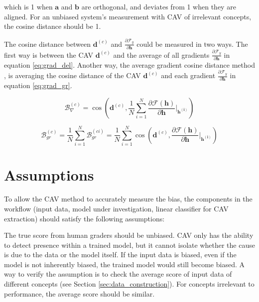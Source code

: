 which is 1 when $\boldsymbol{a}$ and $\boldsymbol{b}$ are orthogonal, and deviates from 1 when they are aligned. For an unbiased system's measurement with CAV of irrelevant concepts, the cosine distance should be 1.

The cosine distance between $\boldsymbol{d}^{(c)}$ and $\frac{\partial \mathcal{F}_y}{\partial \boldsymbol{h}}$ could be measured in two ways. The first way is between the CAV $\boldsymbol{d}^{(c)}$ and the average of all gradients $\frac{\partial \mathcal{F}_y}{\partial \boldsymbol{h}}$ in equation \ref{eq:grad_del}. Another way, the average gradient cosine distance method , is averaging the cosine distance of the CAV $\boldsymbol{d}^{(c)}$ and each gradient $\frac{\partial \mathcal{F}_y}{\partial \boldsymbol{h}}$ in equation \ref{eq:grad_gr}.

\begin{equation} \label{eq:grad_del}
    \mathcal{B}^{(c)}_{\nabla} = \cos\left(\boldsymbol{d}^{(c)}, \frac{1}{N} \sum_{i=1}^{N} \frac{\partial \mathcal{F}(\boldsymbol{h})}{\partial \boldsymbol{h}}\vert_{\boldsymbol{h^{(i)}}} \right)
\end{equation}

\begin{equation} \label{eq:grad_gr}
    \mathcal{B}^{(c)}_{gr} = \frac{1}{N} \sum_{i=1}^{N} \mathcal{B}^{(ci)}_{gr} = \frac{1}{N} \sum_{i=1}^{N}\cos\left(\boldsymbol{d}^{(c)}, \frac{\partial \mathcal{F}(\boldsymbol{h})}{\partial \boldsymbol{h}}\vert_{\boldsymbol{h^{(i)}}} \right)
\end{equation}

\section{Assumptions}
To allow the CAV method to accurately measure the bias, the components in the workflow (input data, model under investigation, linear classifier for CAV extraction) should satisfy the following assumptions:

The true score from human graders should be unbiased. CAV only has the ability to detect presence within a trained model, but it cannot isolate whether the cause is due to the data or the model itself. If the input data is biased, even if the model is not inherently biased, the trained model would still become biased. A way to verify the assumption is to check the average score of input data of different concepts (see Section \ref{sec:data_construction}). For concepts irrelevant to performance, the average score should be similar.

